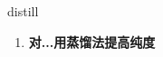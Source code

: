 
\begin{frame}
{\huge distill}
\begin{center}
\begin{enumerate}\Large
  \item \textbf{对...用蒸馏法提高纯度}
\end{enumerate}
\end{center}
\end{frame}
